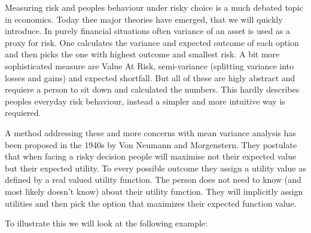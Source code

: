 Measuring risk and peoples behaviour under risky choice is a much debated topic in economics. Today thee major theories have emerged, that we will quickly introduce. In purely financial situations often variance of an asset is used as a proxy for risk. One calculates the variance and expected outcome of each option and then picks the one with highest outcome and smallest risk. A bit more sophisticated measure are Value At Risk, semi-variance (splitting variance into losses and gains) and expected shortfall. But all of these are higly abstract and requiere a person to sit down and calculated the numbers. 
This hardly describes peoples everyday risk behaviour, instead a simpler and more intuitive way is requiered.

A method addressing these and more concerns with mean variance analysis has been proposed in the 1940s by Von Neumann and Morgenstern. They postulate that when facing a risky decision people will maximise not their expected value but their expected utility.  
To every possible outcome they assign a utility value as defined by a real valued utility function. The person does not need to know (and most likely doesn't know) about their utility function. They will implicitly assign utilities and then pick the option that maximizes their expected function value.

To illustrate this we will look at the following example:
